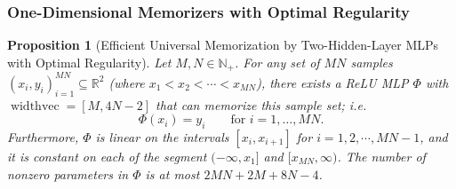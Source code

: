 \documentclass{article}
\numberwithin{equation}{section}
\newtheorem{proposition}{Proposition}[section]
\theoremstyle{definition}
\begin{document}
\subsubsection{One-Dimensional Memorizers with Optimal Regularity}
\label{s:Compute__ss:Memorizers_OptimalRegularity}


\begin{proposition}[Efficient Universal Memorization by Two-Hidden-Layer MLPs with Optimal Regularity]
\label{prop:fit_a_network_with_two_hidden_layers}
Let $M,N\in\mathbb{N}_+$. For any set of $MN$ samples $(x_{i},y_{i})_{i=1}^{MN}\subseteq\mathbb{R}^2$ (where $x_1<x_2<\cdots<x_{MN}$), there exists a ReLU MLP $\Phi$ with $\operatorname{widthvec}=[M,4N-2]$ that can memorize this sample set; i.e. 
\[
    \Phi(x_i)=y_i \qquad \mbox{for } i=1,\dots,MN
.
\]
Furthermore, $\Phi$ is linear on the intervals $[x_i,x_{i+1}]$ for $i=1,2,\cdots,MN-1$, and it is constant on each of the segment $(-\infty,x_1]$ and $[x_{MN},\infty)$. The number of nonzero parameters in $\Phi$ is at most $2MN+2M+8N-4$. 
\end{proposition}
\end{document}
